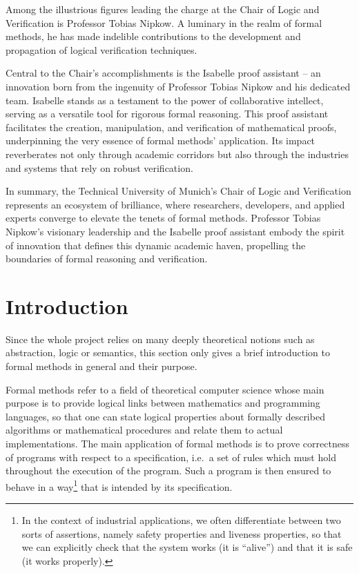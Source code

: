 \documentclass[12pt, a4 paper]{article}
\theoremstyle{definition}
\begin{document}
Among the illustrious figures leading the charge at the Chair of Logic and Verification is Professor Tobias Nipkow. A luminary in the realm of formal methods, he has made indelible contributions to the development and propagation of logical verification techniques.

Central to the Chair's accomplishments is the Isabelle proof assistant -- an innovation born from the ingenuity of Professor Tobias Nipkow and his dedicated team. Isabelle stands as a testament to the power of collaborative intellect, serving as a versatile tool for rigorous formal reasoning. This proof assistant facilitates the creation, manipulation, and verification of mathematical proofs, underpinning the very essence of formal methods' application. Its impact reverberates not only through academic corridors but also through the industries and systems that rely on robust verification.

In summary, the Technical University of Munich's Chair of Logic and Verification represents an ecosystem of brilliance, where researchers, developers, and applied experts converge to elevate the tenets of formal methods. Professor Tobias Nipkow's visionary leadership and the Isabelle proof assistant embody the spirit of innovation that defines this dynamic academic haven, propelling the boundaries of formal reasoning and verification.

\section{Introduction}

Since the whole project relies on many deeply theoretical notions such as abstraction, logic or semantics, this section only gives a brief introduction to formal methods in general and their purpose.

\bigskip

Formal methods refer to a field of theoretical computer science whose main purpose is to provide logical links between mathematics and programming languages, so that one can state logical properties about formally described algorithms or mathematical procedures and relate them to actual implementations.
The main application of formal methods is to prove correctness of programs with respect to a specification, i.e.\ a set of rules which must hold throughout the execution of the program.
Such a program is then ensured to behave in a way\footnote{In the context of industrial applications, we often differentiate between two sorts of assertions, namely safety properties and liveness properties, so that we can explicitly check that the system works (it is ``alive'') and that it is safe (it works properly).} that is intended by its specification.
\end{document}
